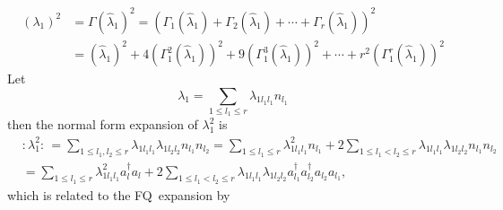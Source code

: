 \documentclass[aps,preprint]{revtex4}%
\begin{document}
\begin{align*}
\left(  \lambda_{1}\right)  ^{2}  &  =\Gamma\left(  \hat{\lambda}_{1}\right)
^{2}=\left(  \Gamma_{1}\left(  \hat{\lambda}_{1}\right)  +\Gamma_{2}\left(
\hat{\lambda}_{1}\right)  +\cdots+\Gamma_{r}\left(  \hat{\lambda}_{1}\right)
\right)  ^{2}\\
&  =\left(  \hat{\lambda}_{1}\right)  ^{2}+4\left(  \Gamma_{1}^{2}\left(
\hat{\lambda}_{1}\right)  \right)  ^{2}+9\left(  \Gamma_{1}^{3}\left(
\hat{\lambda}_{1}\right)  \right)  ^{2}+\cdots+r^{2}\left(  \Gamma_{1}%
^{r}\left(  \hat{\lambda}_{1}\right)  \right)  ^{2}%
\end{align*}
Let
\[
\lambda_{1}=\sum_{1\leq l_{1}\leq r}\lambda_{1l_{1}l_{1}}n_{l_{1}}%
\]
then the normal form expansion of $\lambda_{1}^{2}$ is
\begin{align*}
&  :\lambda_{1}^{2}:\,=\sum_{1\leq l_{1},l_{2}\leq r}\lambda_{1l_{1}l_{1}%
}\lambda_{1l_{2}l_{2}}n_{l_{1}}n_{l_{2}}=\sum_{1\leq l_{1}\leq r}%
\lambda_{1l_{1}l_{1}}^{2}n_{l_{1}}+2\sum_{1\leq l_{1}<l_{2}\leq r}%
\lambda_{1l_{1}l_{1}}\lambda_{1l_{2}l_{2}}n_{l_{1}}n_{l_{2}}\\
&  =\sum_{1\leq l_{1}\leq r}\lambda_{1l_{1}l_{1}}^{2}a_{l}^{\dagger}%
a_{l}+2\sum_{1\leq l_{1}<l_{2}\leq r}\lambda_{1l_{1}l_{1}}\lambda_{1l_{2}%
l_{2}}a_{l_{1}}^{\dagger}a_{l_{2}}^{\dagger}a_{l_{2}}a_{l_{1}},
\end{align*}
which is related to the FQ\ expansion by
\end{document}
